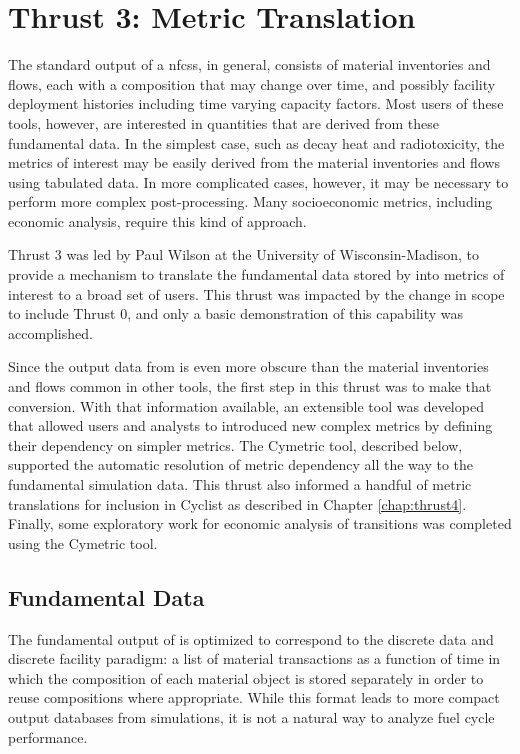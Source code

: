 \chapter{Thrust 3: Metric Translation}\label{chap:thrust3}

The standard output of a \glspl{nfcs}, in general, consists of material
inventories and flows, each with a composition that may change over time, and
possibly facility deployment histories including time varying capacity
factors.  Most users of these tools, however, are interested in quantities
that are derived from these fundamental data.  In the simplest case, such as
decay heat and radiotoxicity, the metrics of interest may be easily derived
from the material inventories and flows using tabulated data.  In more
complicated cases, however, it may be necessary to perform more complex
post-processing.  Many socioeconomic metrics, including economic analysis,
require this kind of approach.

Thrust 3 was led by Paul Wilson at the University of Wisconsin-Madison, to
provide a mechanism to translate the fundamental data stored by \Cyclus into
metrics of interest to a broad set of users.  This thrust was impacted by the
change in scope to include Thrust 0, and only a basic demonstration of this
capability was accomplished.

Since the output data from \Cyclus is even more obscure than the material
inventories and flows common in other tools, the first step in this thrust was
to make that conversion.  With that information available, an extensible tool
was developed that allowed users and analysts to introduced new complex
metrics by defining their dependency on simpler metrics.  The Cymetric tool,
described below, supported the automatic resolution of metric dependency all
the way to the fundamental simulation data.  This thrust also informed a
handful of metric translations for inclusion in Cyclist as described in
Chapter \ref{chap:thrust4}.  Finally, some exploratory work for economic
analysis of transitions was completed using the Cymetric tool.

\section{Fundamental Data}\label{sec:fund_data}

The fundamental output of \Cyclus is optimized to correspond to the discrete
data and discrete facility paradigm: a list of material transactions as a
function of time in which the composition of each material object is stored
separately in order to reuse compositions where appropriate.  While this
format leads to more compact output databases from \Cyclus simulations, it is
not a natural way to analyze fuel cycle performance.

